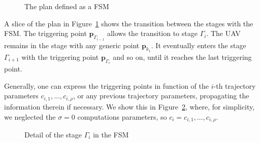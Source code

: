 \documentclass[letterpaper,10pt,conference]{ieeeconf}
\theoremstyle{definition}
\begin{document}
\begin{figure}[h]
  \center
  \caption{The plan defined as a FSM}
  \label{fig:state-machine}
\end{figure}

A slice of the plan in Figure~\ref{fig:state-machine} shows the transition between the stages with the FSM. The triggering point $\mathbf{p}_{\Gamma_{i-1}}$ allows the transition to stage $\Gamma_i$. The UAV remains in the stage with any generic point $\mathbf{p}_{k_1}$. It eventually enters the stage $\Gamma_{i+1}$ with the triggering point $\mathbf{p}_{\Gamma_i}$ and so on, until it reaches the last triggering point.

Generally, one can express the triggering points in function of the $i$-th trajectory parameters $c_{i,1},\dots,c_{i,\rho}$, or any previous trajectory parameters, propagating the information therein if necessary. We show this in Figure~\ref{fig:state-machine2}, where, for simplicity, we neglected the $\sigma=0$ computations parameters, so $c_i=c_{i,1},\dots,c_{i,\rho}$.

\begin{figure}[h]
  \center
  \caption{Detail of the stage $\Gamma_i$ in the FSM}
  \label{fig:state-machine2}
\end{figure}
\end{document}
